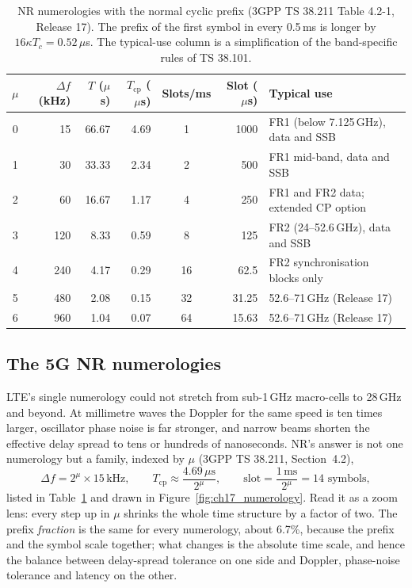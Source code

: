\begin{table}[htbp]\centering\small
\caption{NR numerologies with the normal cyclic prefix (3GPP TS 38.211 Table 4.2-1, Release 17). The prefix
of the first symbol in every 0.5\,ms is longer by $16\kappa T_c=0.52\,\mu$s. The typical-use column is a
simplification of the band-specific rules of TS 38.101.}
\label{tab:ch17:nr}
\begin{tabular}{@{}c r r r c r l@{}}
\toprule
$\mu$ & $\Delta f$ (kHz) & $T$ ($\mu$s) & $T_{\text{cp}}$ ($\mu$s) & Slots/ms & Slot ($\mu$s) & Typical use\\
\midrule
0 & 15 & 66.67 & 4.69 & 1 & 1000 & FR1 (below 7.125\,GHz), data and SSB\\
1 & 30 & 33.33 & 2.34 & 2 & 500 & FR1 mid-band, data and SSB\\
2 & 60 & 16.67 & 1.17 & 4 & 250 & FR1 and FR2 data; extended CP option\\
3 & 120 & 8.33 & 0.59 & 8 & 125 & FR2 (24--52.6\,GHz), data and SSB\\
4 & 240 & 4.17 & 0.29 & 16 & 62.5 & FR2 synchronisation blocks only\\
5 & 480 & 2.08 & 0.15 & 32 & 31.25 & 52.6--71\,GHz (Release 17)\\
6 & 960 & 1.04 & 0.07 & 64 & 15.63 & 52.6--71\,GHz (Release 17)\\
\bottomrule
\end{tabular}
\end{table}

\subsection{The 5G NR numerologies}

LTE's single numerology could not stretch from sub-1\,GHz macro-cells to 28\,GHz and beyond. At millimetre
waves the Doppler for the same speed is ten times larger, oscillator phase noise is far stronger, and
narrow beams shorten the effective delay spread to tens or hundreds of nanoseconds. NR's answer is
not one numerology but a family, indexed by $\mu$ (3GPP TS 38.211, Section~4.2),
\begin{equation}
\Delta f=2^\mu\times15\,\text{kHz},\qquad T_{\text{cp}}\approx\frac{4.69\,\mu\text{s}}{2^\mu},\qquad
\text{slot}=\frac{1\,\text{ms}}{2^\mu}=14\text{ symbols},
\end{equation}
listed in Table~\ref{tab:ch17:nr} and drawn in Figure~\ref{fig:ch17_numerology}. Read it as a zoom
lens: every step up in $\mu$ shrinks the whole time structure by a factor of two. The prefix
\emph{fraction} is the same for every numerology, about 6.7\%, because the prefix and the symbol
scale together; what changes is the absolute time scale, and hence the balance between delay-spread
tolerance on one side and Doppler, phase-noise tolerance and latency on the other.

